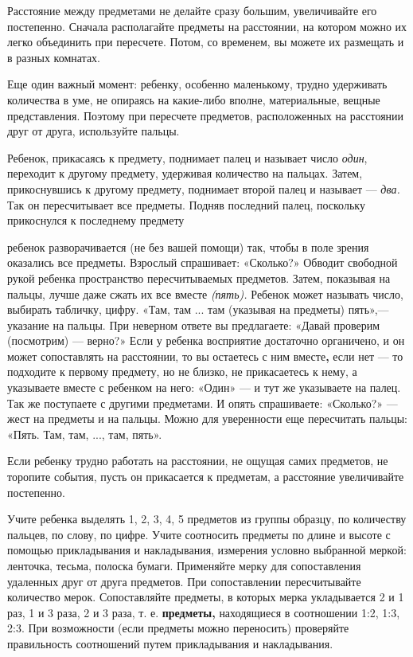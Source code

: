 \documentclass[a5paper]{book}
\renewcommand{\emph}[1]{\textit{#1}}
\begin{document}
Расстояние между предметами не делайте сразу большим, увеличивайте его
постепенно. Сначала располагайте предметы на расстоянии, на котором
можно их легко объединить при пересчете. Потом, со временем, вы можете
их размещать и в разных комнатах.

Еще один важный момент: ребенку, особенно маленькому, трудно удерживать
количества в уме, не опираясь на какие-либо вполне, материальные, вещные
представления. Поэтому при пересчете предметов, расположенных на
расстоянии друг от друга, используйте пальцы.

Ребенок, прикасаясь к предмету, поднимает палец и называет число
\emph{один}, переходит к другому предмету, удерживая количество на
пальцах\textsc{.} Затем, прикоснувшись к другому предмету, поднимает
второй палец и называет --- \emph{два.} Так он пересчитывает все
предметы. Подняв последний палец, поскольку прикоснулся к последнему
предмету

ребенок разворачивается (не без вашей помощи) так, чтобы в поле зрения
оказались все предметы. Взрослый спрашивает: «Сколько?» Обводит
свободной рукой ребенка пространство пересчитываемых предметов. Затем,
показывая на пальцы, лучше даже сжать их все вместе \emph{(пять).}
Ребенок может называть число, выбирать табличку, цифру. «Там, там ...
там (указывая на предметы) пять»,--- указание на пальцы. При неверном
ответе вы предлагаете: «Давай проверим (посмотрим) --- верно?» Если у
ребенка восприятие достаточно органичено, и он может сопоставлять на
расстоянии, то вы остаетесь с ним вместе\textbf{,} если нет --- то
подходите к первому предмету, но не близко, не прикасаетесь к нему, а
указываете вместе с ребенком на него: «Один» --- и тут же указываете на
палец. Так же поступаете с другими предметами. И опять спрашиваете:
«Сколько?» --- жест на предметы и на пальцы. Можно для уверенности еще
пересчитать пальцы: «Пять. Там, там, ..., там, пять».

Если ребенку трудно работать на расстоянии, не ощущая самих предметов,
не торопите события, пусть он прикасается к предметам, а расстояние
увеличивайте постепенно.

Учите ребенка выделять 1, 2, 3, 4, 5 предметов из группы образцу, по
количеству пальцев, по слову, по цифре. Учите соотносить предметы по
длине и высоте с помощью прикладывания и накладывания, измерения условно
выбранной меркой: ленточка, тесьма, полоска бумаги. Применяйте мерку для
сопоставления удаленных друг от друга предметов. При сопоставлении
пересчитывайте количество мерок. Сопоставляйте предметы, в которых мерка
укладывается 2 и 1 раз, 1 и 3 раза, 2 и 3 раза, т. е. \textbf{предметы,}
находящиеся в соотношении 1:2, 1:3, 2:3. При возможности (если предметы
можно переносить) проверяйте правильность соотношений путем
прикладывания и накладывания.
\end{document}
